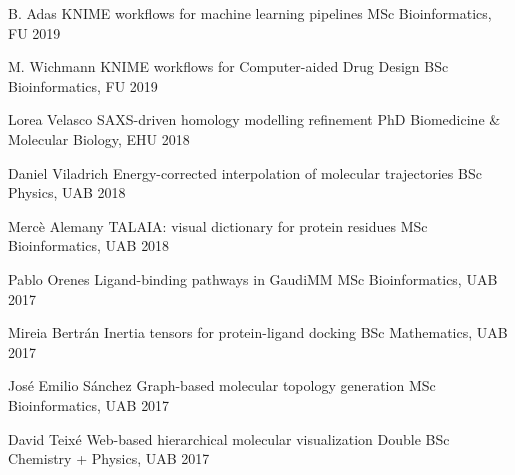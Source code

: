 


\begin{cvhonors}



\cvhonor
    {B. Adas}
    {KNIME workflows for machine learning pipelines}
    {MSc Bioinformatics, FU}
    {2019}

\cvhonor
    {M. Wichmann}
    {KNIME workflows for Computer-aided Drug Design}
    {BSc Bioinformatics, FU}
    {2019}

\cvhonor
    {Lorea Velasco}
    {SAXS-driven homology modelling refinement}
    {PhD Biomedicine \& Molecular Biology, EHU}
    {2018}

\cvhonor
    {Daniel Viladrich}
    {Energy-corrected interpolation of molecular trajectories}
    {BSc Physics, UAB}
    {2018}

\cvhonor
    {Mercè Alemany}
    {TALAIA: visual dictionary for protein residues}
    {MSc Bioinformatics, UAB}
    {2018}

\cvhonor
    {Pablo Orenes}
    {Ligand-binding pathways in GaudiMM}
    {MSc Bioinformatics, UAB}
    {2017}

\cvhonor
    {Mireia Bertrán}
    {Inertia tensors for protein-ligand docking}
    {BSc Mathematics, UAB}
    {2017}

\cvhonor
    {José Emilio Sánchez}
    {Graph-based molecular topology generation}
    {MSc Bioinformatics, UAB}
    {2017}

\cvhonor
    {David Teixé}
    {Web-based hierarchical molecular visualization}
    {Double BSc Chemistry + Physics, UAB}
    {2017}


\end{cvhonors}
